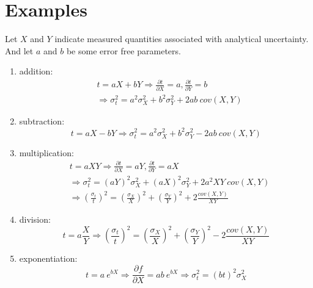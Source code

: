 \documentclass{book}
\begin{document}
\section{Examples}

Let $X$ and $Y$ indicate measured quantities associated with
analytical uncertainty.  And let $a$ and $b$ be some error free
parameters.

\begin{enumerate}
\item{addition:}
\begin{align}
& t = a X + b Y \Rightarrow \frac{\partial t}{\partial X} = a, 
\frac{\partial t}{\partial Y} = b \nonumber\\
& \Rightarrow \sigma^2_t = a^2 \sigma^2_X + b^2 \sigma^2_Y + 2ab~cov(X,Y)
\label{eq:addition}
\end{align}

\item{subtraction:}
\begin{equation}
t = a X - b Y \Rightarrow
\sigma^2_t = a^2 \sigma^2_X + b^2 \sigma^2_Y - 2ab~cov(X,Y)
\label{eq:subtraction}
\end{equation}

\item{multiplication:}
\begin{align}
& t = a X Y \Rightarrow \frac{\partial t}{\partial X} = a Y, 
\frac{\partial t}{\partial Y} = aX \nonumber\\
& \Rightarrow \sigma^2_t = (aY)^2 \sigma^2_X + (aX)^2 \sigma^2_Y + 2a^2 XY~cov(X,Y) \nonumber\\
& \Rightarrow \left(\frac{\sigma_t}{t}\right)^2 = \left(\frac{\sigma_X}{X}\right)^2 + 
  \left(\frac{\sigma_Y}{Y}\right)^2 + 2 \frac{cov(X,Y)}{X Y}
\label{eq:multiplication}
\end{align}

\item{division:}
\begin{equation}
t = a \frac{X}{Y} \Rightarrow
\left(\frac{\sigma_t}{t}\right)^2 = \left(\frac{\sigma_X}{X}\right)^2 + 
  \left(\frac{\sigma_Y}{Y}\right)^2 - 2 \frac{cov(X,Y)}{X Y}
\label{eq:division}
\end{equation}

\item{exponentiation:}
\begin{equation}
t = a~e^{bX} \Rightarrow \frac{\partial f}{\partial X} = ab~e^{bX} 
\Rightarrow \sigma^2_t = (b t)^2 \sigma_X^2
\label{eq:exponentiation}
\end{equation}


\end{enumerate}
\end{document}
